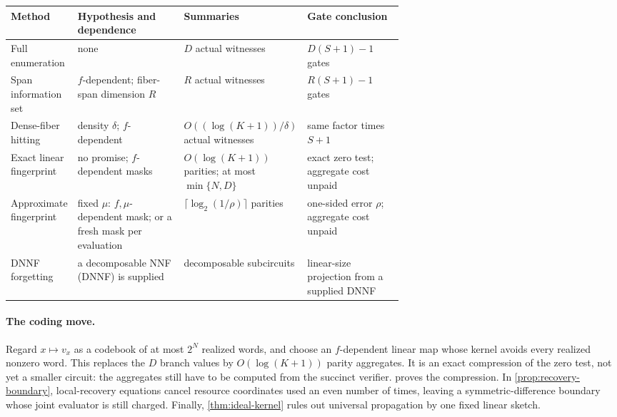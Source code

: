 \documentclass[11pt]{article}
\theoremstyle{definition}
\theoremstyle{remark}
\begin{document}
\begin{center}
\scriptsize
\begin{tabularx}{\linewidth}{@{}
  >{\raggedright\arraybackslash}p{0.17\linewidth}
  >{\raggedright\arraybackslash}p{0.27\linewidth}
  >{\raggedright\arraybackslash}p{0.20\linewidth}
  >{\raggedright\arraybackslash}X@{}}
\toprule
Method & Hypothesis and dependence & Summaries & Gate conclusion \\
\midrule
Full enumeration
  & none
  & $D$ actual witnesses
  & $D(S+1)-1$ gates \\
Span information set
  & $f$-dependent; fiber-span dimension $R$
  & $R$ actual witnesses
  & $R(S+1)-1$ gates \\
Dense-fiber hitting
  & density $\delta$; $f$-dependent
  & $O((\log(K+1))/\delta)$ actual witnesses
  & same factor times $S+1$ \\
Exact linear fingerprint
  & no promise; $f$-dependent masks
  & $O(\log(K+1))$ parities; at most $\min\{N,D\}$
  & exact zero test; aggregate cost unpaid \\
Approximate fingerprint
  & fixed $\mu$: $f,\mu$-dependent mask; or a fresh mask per evaluation
  & $\lceil\log_2(1/\rho)\rceil$ parities
  & one-sided error $\rho$; aggregate cost unpaid \\
DNNF forgetting
  & a decomposable NNF (DNNF) is supplied
  & decomposable subcircuits
  & linear-size projection from a supplied DNNF \\
\bottomrule
\end{tabularx}
\end{center}

\paragraph{The coding move.}
Regard $x\mapsto v_x$ as a codebook of at most $2^N$ realized words, and
choose an $f$-dependent linear map whose kernel avoids every realized nonzero
word.  This replaces the $D$ branch values by $O(\log(K+1))$ parity
aggregates.  It is an exact compression of the zero test, not yet a smaller
circuit: the aggregates still have to be computed from the succinct
verifier.   proves the compression.  In
\cref{prop:recovery-boundary}, local-recovery equations cancel resource
coordinates used an even number of times, leaving a symmetric-difference
boundary whose joint evaluator is still charged.  Finally,
\cref{thm:ideal-kernel} rules out universal propagation by one fixed linear
sketch.
\end{document}
